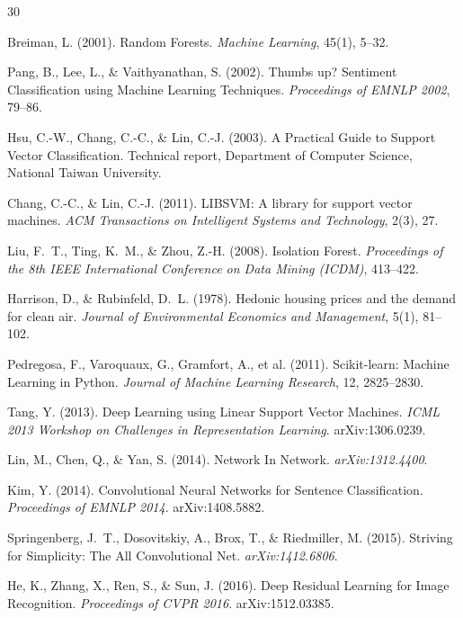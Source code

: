 \documentclass[10pt,twocolumn]{article}
\begin{document}

\begin{thebibliography}{30}

Breiman, L. (2001).
Random Forests.
\textit{Machine Learning}, 45(1), 5--32.

Pang, B., Lee, L., \& Vaithyanathan, S. (2002).
Thumbs up? Sentiment Classification using Machine Learning Techniques.
\textit{Proceedings of EMNLP 2002}, 79--86.

Hsu, C.-W., Chang, C.-C., \& Lin, C.-J. (2003).
A Practical Guide to Support Vector Classification. Technical report, Department of Computer
Science, National Taiwan University.

Chang, C.-C., \& Lin, C.-J. (2011).
LIBSVM: A library for support vector machines.
\textit{ACM Transactions on Intelligent Systems and Technology}, 2(3), 27.

Liu, F.~T., Ting, K.~M., \& Zhou, Z.-H. (2008).
Isolation Forest.
\textit{Proceedings of the 8th IEEE International Conference on Data Mining (ICDM)}, 413--422.

Harrison, D., \& Rubinfeld, D.~L. (1978).
Hedonic housing prices and the demand for clean air.
\textit{Journal of Environmental Economics and Management}, 5(1), 81--102.

Pedregosa, F., Varoquaux, G., Gramfort, A., et al. (2011).
Scikit-learn: Machine Learning in Python.
\textit{Journal of Machine Learning Research}, 12, 2825--2830.

Tang, Y. (2013).
Deep Learning using Linear Support Vector Machines.
\textit{ICML 2013 Workshop on Challenges in Representation Learning}. arXiv:1306.0239.

Lin, M., Chen, Q., \& Yan, S. (2014).
Network In Network. \textit{arXiv:1312.4400}.

Kim, Y. (2014).
Convolutional Neural Networks for Sentence Classification.
\textit{Proceedings of EMNLP 2014}. arXiv:1408.5882.

Springenberg, J.~T., Dosovitskiy, A., Brox, T., \& Riedmiller, M. (2015).
Striving for Simplicity: The All Convolutional Net. \textit{arXiv:1412.6806}.

He, K., Zhang, X., Ren, S., \& Sun, J. (2016).
Deep Residual Learning for Image Recognition.
\textit{Proceedings of CVPR 2016}. arXiv:1512.03385.


\end{thebibliography}
\end{document}
